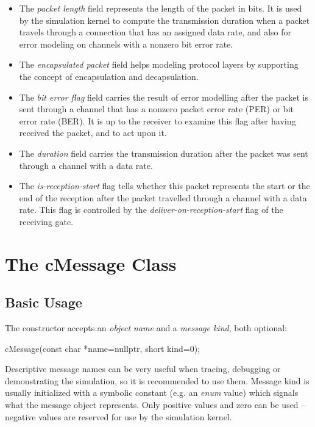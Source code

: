 \begin{itemize}
  \item The \textit{packet length} field represents the length of the packet
    in bits. It is used by the simulation kernel to compute the transmission
    duration when a packet travels through a connection that has an assigned
    data rate, and also for error modeling on channels with a nonzero
    bit error rate.
  \item The \textit{encapsulated packet} field helps modeling protocol layers
    by supporting the concept of encapsulation and decapsulation.
  \item The \textit{bit error flag} field carries the result of error
    modelling after the packet is sent through a channel that has a nonzero
    packet error rate (PER) or bit error rate (BER). It is up to the receiver
    to examine this flag after having received the packet, and to act upon it.
  \item The \textit{duration} field carries the transmission duration after
    the packet was sent through a channel with a data rate.
  \item The \textit{is-reception-start} flag tells whether this packet
    represents the start or the end of the reception after the packet travelled
    through a channel with a data rate. This flag is controlled by the
    \textit{deliver-on-reception-start} flag of the receiving gate.
\end{itemize}


\section{The cMessage Class}
\label{sec:ch-msgs:cmessage}

\subsection{Basic Usage}

The  constructor accepts an \textit{object name}
and a \textit{message kind}, both optional:

\begin{cpp}
cMessage(const char *name=nullptr, short kind=0);
\end{cpp}

Descriptive message names can be very useful when tracing, debugging or
demonstrating the simulation, so it is recommended to use them.
Message kind is usually initialized with a symbolic constant
(e.g. an \textit{enum} value) which signals what the message object
represents. Only positive values and zero can be used --
negative values are reserved for use by the simulation kernel.

